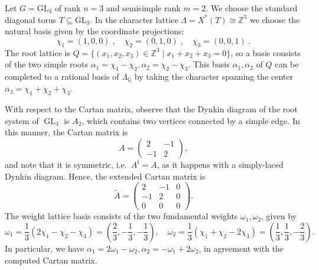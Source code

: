 \documentclass[11pt,english]{amsart}
\numberwithin{equation}{section}
\numberwithin{figure}{section}
\theoremstyle{plain}
\theoremstyle{plain}
\theoremstyle{definition}
\theoremstyle{remark}
\newcommand{\ZZ}{\mathbb{Z}}
\newcommand{\QQ}{\mathbb{Q}}
\newcommand{\GL}{\operatorname{GL}}
\begin{document}
Let $G = \text{GL}_3$ of rank $n = 3$ and semisimple rank $m = 2$. We choose the standard diagonal torus $T \subseteq \text{GL}_3$. In the character lattice $\Lambda = X^*(T) \cong \mathbb{Z}^3$ we choose the natural basis given by the coordinate projections:
\[
\chi_1=(1,0,0)\; ,\quad \chi_2=(0,1,0)\; ,\quad \chi_3=(0,0,1)\; .
\]
The root lattice is $Q = \{(x_1, x_2, x_3) \in \ZZ^3\mid x_1+x_2+x_3=0\}$, so a basis consists of the two simple roots $\alpha_1 = \chi_1 - \chi_2, \alpha_2 = \chi_2 - \chi_3$. 
This basis $\alpha_1, \alpha_2$ of $Q$ can be completed to a rational basis of $\Lambda_{\QQ}$ by taking the character spanning the center
$
    \alpha_3 = \chi_1 + \chi_2 + \chi_3.
$

With respect to the Cartan matrix, observe that the Dynkin diagram of the root system of $\GL_3$ is $A_2$, which contains two vertices connected by a simple edge. In this manner, the Cartan matrix is
\[
A = \left(\begin{array}{cc} 2 & -1 \\ -1 & 2 \end{array}\right), 
\]
and note that it is symmetric, i.e.\ $A^t=A$, as it happens with a simply-laced Dynkin diagram. Hence, the extended Cartan matrix is
\[
\widetilde{A} = \left( \begin{array}{cc|c} 2 & -1 & 0 \\ -1 & 2 & 0 \\ \hline 0 & 0 & 0 \end{array} \right).
\]
The weight lattice basis consists of the two fundamental weights $\omega_1, \omega_2$, given by
\[
\omega_1 = \frac{1}{3}(2\chi_1 -\chi_2-\chi_3)=\left(\frac{2}{3}, -\frac{1}{3}, -\frac{1}{3}\right), \quad  \omega_2 = \frac{1}{3}(\chi_1 +\chi_2-2\chi_3)=\left(\frac{1}{3}, \frac{1}{3}, -\frac{2}{3}\right).
\]
In particular, we have
    $\alpha_1 = 2 \omega_1 -\omega_2, \alpha_2 = -\omega_1 + 2 \omega_2$, 
in agreement with the computed Cartan matrix.
\end{document}
